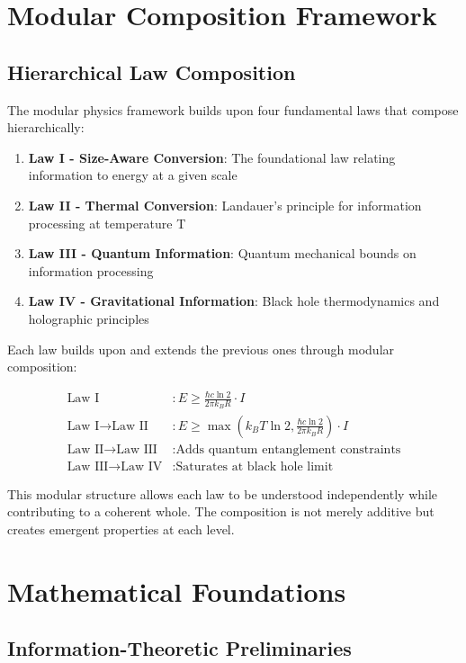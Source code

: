 \documentclass[11pt,a4paper]{article}
\theoremstyle{definition}
\begin{document}
\section{Modular Composition Framework}

\subsection{Hierarchical Law Composition}

The modular physics framework builds upon four fundamental laws that compose hierarchically:

\begin{enumerate}
\item \textbf{Law I - Size-Aware Conversion}: The foundational law relating information to energy at a given scale
\item \textbf{Law II - Thermal Conversion}: Landauer's principle for information processing at temperature T
\item \textbf{Law III - Quantum Information}: Quantum mechanical bounds on information processing
\item \textbf{Law IV - Gravitational Information}: Black hole thermodynamics and holographic principles
\end{enumerate}

Each law builds upon and extends the previous ones through modular composition:

\begin{align}
\text{Law I} &: E \geq \frac{\hbar c \ln 2}{2\pi k_B R} \cdot I \\
\text{Law I} \to \text{Law II} &: E \geq \max\left(k_B T \ln 2, \frac{\hbar c \ln 2}{2\pi k_B R}\right) \cdot I \\
\text{Law II} \to \text{Law III} &: \text{Adds quantum entanglement constraints} \\
\text{Law III} \to \text{Law IV} &: \text{Saturates at black hole limit}
\end{align}

This modular structure allows each law to be understood independently while contributing to a coherent whole. The composition is not merely additive but creates emergent properties at each level.

\section{Mathematical Foundations}

\subsection{Information-Theoretic Preliminaries}
\end{document}
